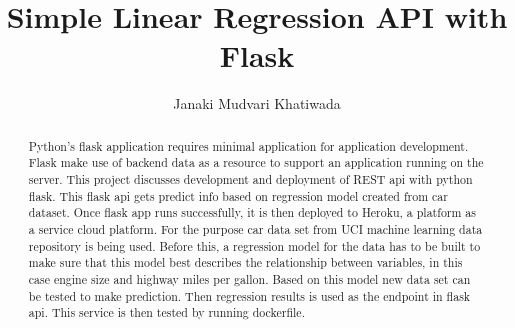 \title{Simple Linear Regression API with Flask}



\author{Janaki Mudvari Khatiwada}


\renewcommand{\shortauthors}{J. M. Khatiwada}



\begin{abstract}
  Python's flask application requires minimal application for application
  development. Flask make use of backend data as a resource to support an
  application running on the server. This project discusses development
  and deployment of REST api with python flask. This flask api gets predict
  info based on regression model created from car dataset. Once flask app runs 
  successfully, it is then deployed to Heroku, a platform as a service 
  cloud platform. For the purpose car data set from UCI machine learning
  data repository is being used. Before this, a regression model for the
  data has to be built to make sure that this model best describes the 
  relationship between variables, in this case engine size and highway
  miles per gallon. Based on this model new data set can be tested to make 
  prediction. Then regression results is used as the endpoint 
  in flask api. This service is then tested by running dockerfile.
   
\end{abstract}



\maketitle

